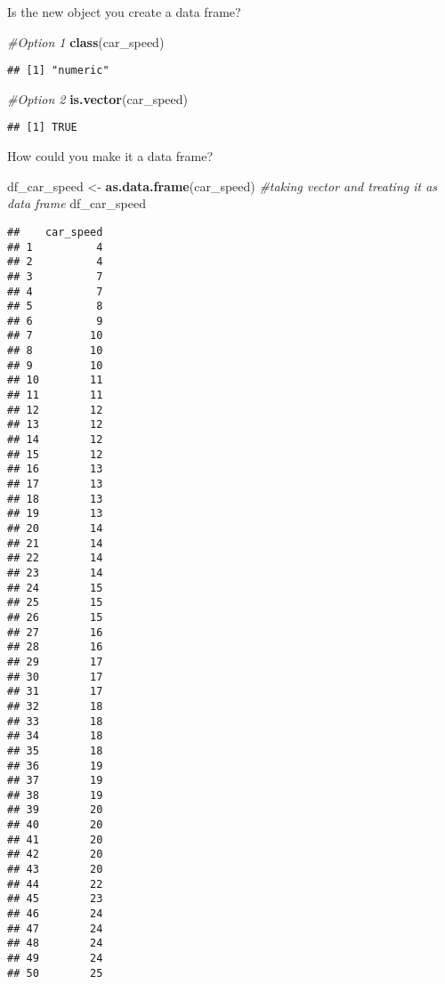 \documentclass[
]{article}
\newenvironment{Shaded}{\begin{snugshade}}{\end{snugshade}}
\newcommand{\CommentTok}[1]{\textcolor[rgb]{0.56,0.35,0.01}{\textit{#1}}}
\newcommand{\FunctionTok}[1]{\textcolor[rgb]{0.13,0.29,0.53}{\textbf{#1}}}
\newcommand{\NormalTok}[1]{#1}
\newcommand{\OtherTok}[1]{\textcolor[rgb]{0.56,0.35,0.01}{#1}}
\begin{document}
Is the new object you create a data frame?

\begin{Shaded}
\begin{Highlighting}[]
\CommentTok{\#Option 1}
\FunctionTok{class}\NormalTok{(car\_speed)}
\end{Highlighting}
\end{Shaded}

\begin{verbatim}
## [1] "numeric"
\end{verbatim}

\begin{Shaded}
\begin{Highlighting}[]
\CommentTok{\#Option 2}
\FunctionTok{is.vector}\NormalTok{(car\_speed)}
\end{Highlighting}
\end{Shaded}

\begin{verbatim}
## [1] TRUE
\end{verbatim}

How could you make it a data frame?

\begin{Shaded}
\begin{Highlighting}[]
\NormalTok{df\_car\_speed }\OtherTok{\textless{}{-}} \FunctionTok{as.data.frame}\NormalTok{(car\_speed) }\CommentTok{\#taking vector and treating it as data frame}
\NormalTok{df\_car\_speed}
\end{Highlighting}
\end{Shaded}

\begin{verbatim}
##    car_speed
## 1          4
## 2          4
## 3          7
## 4          7
## 5          8
## 6          9
## 7         10
## 8         10
## 9         10
## 10        11
## 11        11
## 12        12
## 13        12
## 14        12
## 15        12
## 16        13
## 17        13
## 18        13
## 19        13
## 20        14
## 21        14
## 22        14
## 23        14
## 24        15
## 25        15
## 26        15
## 27        16
## 28        16
## 29        17
## 30        17
## 31        17
## 32        18
## 33        18
## 34        18
## 35        18
## 36        19
## 37        19
## 38        19
## 39        20
## 40        20
## 41        20
## 42        20
## 43        20
## 44        22
## 45        23
## 46        24
## 47        24
## 48        24
## 49        24
## 50        25
\end{verbatim}
\end{document}
